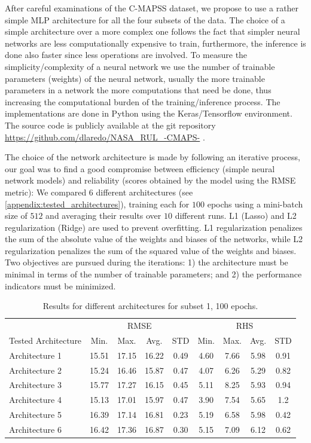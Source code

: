 \documentclass[preprint,12pt]{elsarticle}%
\begin{document}
After careful examinations of the C-MAPSS dataset, we propose to use a rather
simple MLP architecture for all the four subsets of the data. The choice of a simple architecture over a more complex one follows the fact that simpler neural networks are less computationally expensive to train, furthermore, the inference is done also faster since less operations are involved. To measure the simplicity/complexity of a neural network we use the number of trainable parameters (weights) of the neural network, usually the more trainable parameters in a network the more computations that need be done, thus increasing the computational burden of the training/inference process. The implementations are done in Python using the Keras/Tensorflow environment. The source code is publicly available at the git repository \url{https://github.com/dlaredo/NASA_RUL_-CMAPS-} \cite{Laredo2018}.

The choice of the network architecture is made by following an iterative
process, our goal was to find a good compromise between efficiency (simple neural network models) and reliability (scores obtained by the model using the RMSE metric): We compared 6 different architectures (see \ref{appendix:tested_architectures}), training each for $100$ epochs using a mini-batch size of $512$ and averaging their results over
$10$ different runs. L1 (Lasso) and L2 regularization (Ridge) 
\cite{Buhlmann2011} are used to prevent overfitting. L1 regularization 
penalizes the sum of the absolute value of the weights and biases of the networks, 
while L2 regularization penalizes the sum of the squared value of the weights and biases. 
Two objectives are pursued during the iterations: 1) the architecture must be minimal in 
terms of the number of trainable parameters; and 2) the performance indicators must be minimized.

\begin{table}[!htb]
\begin{center}
\begin{tabular}
[c]{l|cccc|cccc}\hline & \multicolumn{4}{|c}{RMSE} & \multicolumn{4}{|c}{RHS}\\
Tested Architecture & Min. & Max. & Avg. & STD & Min. & Max. & Avg. & STD\\\hline
Architecture 1 & 15.51 & 17.15 & 16.22 & 0.49 & 4.60 & 7.66 & 5.98 & 0.91\\
Architecture 2 & 15.24 & 16.46 & 15.87 & 0.47 & 4.07 & 6.26 & 5.29 & 0.82\\
Architecture 3 & 15.77 & 17.27 & 16.15 & 0.45 & 5.11 & 8.25 & 5.93 & 0.94\\
Architecture 4 & 15.13 & 17.01 & 15.97 & 0.47 & 3.90 & 7.54 & 5.65 & 1.2\\
Architecture 5 & 16.39 & 17.14 & 16.81 & 0.23 & 5.19 & 6.58 & 5.98 & 0.42\\
Architecture 6 & 16.42 & 17.36 & 16.87 & 0.30 & 5.15 & 7.09 & 6.12 & 0.62\\\hline
\end{tabular}
\caption{Results for different architectures for subset 1, 100 epochs.}
\label{table:tested_architectures_100}
\end{center}
\end{table}
\end{document}

